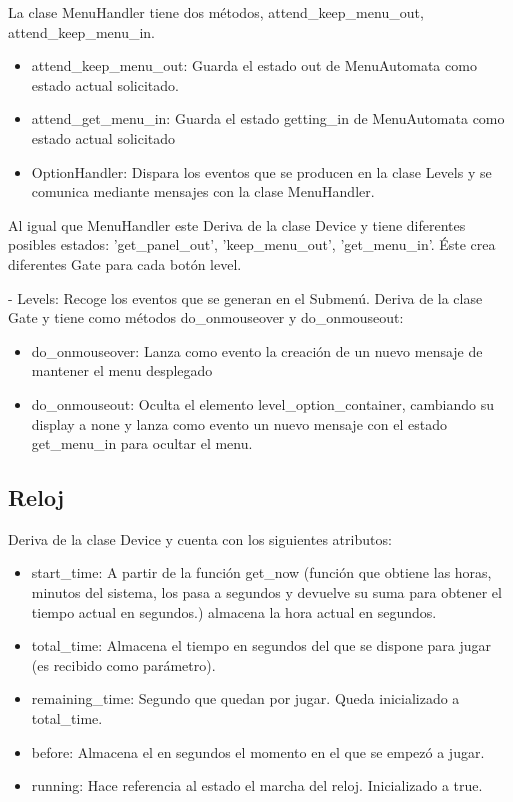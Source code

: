 La clase MenuHandler tiene dos métodos, attend\_keep\_menu\_out, attend\_keep\_menu\_in.
\begin{itemize}
 \item attend\_keep\_menu\_out: Guarda el estado out de MenuAutomata como estado actual solicitado.

 \item attend\_get\_menu\_in: Guarda el estado getting\_in de MenuAutomata como estado actual solicitado

 \item OptionHandler: Dispara los eventos que se producen en la clase Levels y se comunica mediante mensajes con la clase MenuHandler.
\end{itemize}

Al igual que MenuHandler este Deriva de la clase Device  y tiene diferentes posibles estados:
'get\_panel\_out', 'keep\_menu\_out', 'get\_menu\_in'.
Éste crea diferentes Gate para cada botón level.

- Levels: Recoge los eventos que se generan en el Submenú. 
Deriva de la clase Gate y tiene como métodos do\_onmouseover y do\_onmouseout:

\begin{itemize}
 \item do\_onmouseover: Lanza como evento la creación de un nuevo mensaje de mantener el menu desplegado

 \item do\_onmouseout: Oculta el elemento level\_option\_container, cambiando su display a none y lanza como evento un nuevo mensaje con el estado 
get\_menu\_in para ocultar el menu.
\end{itemize}


\subsection{Reloj}
\label{subsection:reloj}

Deriva de la clase Device y cuenta con los siguientes atributos:

\begin{itemize}
 \item start\_time: A partir de la función get\_now (función que obtiene las horas, minutos del sistema, los pasa a segundos y devuelve su suma para 
obtener el tiempo actual en segundos.) almacena la hora actual en segundos.

 \item total\_time: Almacena el tiempo en segundos del que se dispone para jugar (es recibido como parámetro).
 
 \item remaining\_time: Segundo que quedan por jugar. Queda inicializado a total\_time.
 
 \item before: Almacena el en segundos el momento en el que se empezó a jugar.
 
 \item running: Hace referencia al estado el marcha del reloj. Inicializado a true.
\end{itemize}

